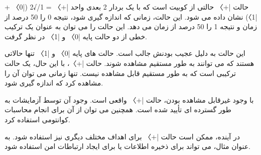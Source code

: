 \documentclass{book}
\begin{document}
حالت |+〉 حالتی از کوبیت است که با یک بردار 2 بعدی واحد |+〉 = 1/√2 (|0〉 + |1〉) نشان داده می شود. این حالت، زمانی که اندازه گیری شود، نتیجه 0 را 50 درصد از زمان و نتیجه 1 را 50 درصد از زمان می دهد. این حالت را می توان به عنوان یک ترکیب خطی از دو حالت پایه |0〉 و |1〉 در نظر گرفت.

این حالت به دلیل عجیب بودنش جالب است. حالت های پایه |0〉 و |1〉 تنها حالاتی هستند که می توانند به طور مستقیم مشاهده شوند. حالت |+〉، با این حال، یک حالت ترکیبی است که به طور مستقیم قابل مشاهده نیست. تنها زمانی می توان آن را مشاهده کرد که اندازه گیری شود.

با وجود غیرقابل مشاهده بودن، حالت |+〉 واقعی است. وجود آن توسط آزمایشات به طور گسترده ای تأیید شده است. همچنین می توان از آن برای انجام محاسبات کوانتومی استفاده کرد.

در آینده، ممکن است حالت |+〉 برای اهداف مختلف دیگری نیز استفاده شود. به عنوان مثال، می تواند برای ذخیره اطلاعات یا برای ایجاد ارتباطات امن استفاده شود.
\end{document}
